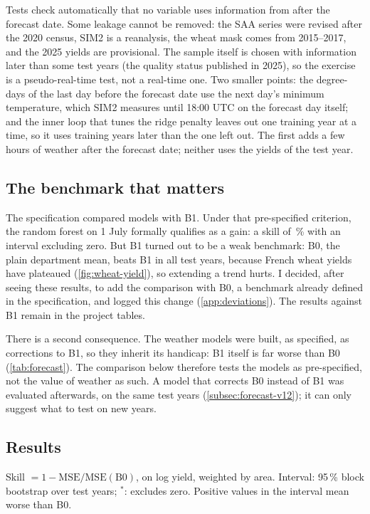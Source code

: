 Tests check automatically that no variable uses information from after the forecast date. Some leakage cannot be removed: the SAA series were revised after the 2020 census, SIM2 is a reanalysis, the wheat mask comes from 2015--2017, and the 2025 yields are provisional. The sample itself is chosen with information later than some test years (the quality status published in 2025), so the exercise is a pseudo-real-time test, not a real-time one. Two smaller points: the degree-days of the last day before the forecast date use the next day's minimum temperature, which SIM2 measures until 18:00 UTC on the forecast day itself; and the inner loop that tunes the ridge penalty leaves out one training year at a time, so it uses training years later than the one left out. The first adds a few hours of weather after the forecast date; neither uses the yields of the test year.

\subsection{The benchmark that matters}

The specification compared models with B1. Under that pre-specified criterion, the random forest on 1 July formally qualifies as a gain: a skill of \RfVsBoneSkill\,\% with an interval excluding zero. But B1 turned out to be a weak benchmark: B0, the plain department mean, beats B1 in all \BzeroBeatsBone{} test years, because French wheat yields have plateaued (\cref{fig:wheat-yield}), so extending a trend hurts. I decided, after seeing these results, to add the comparison with B0, a benchmark already defined in the specification, and logged this change (\cref{app:deviations}). The results against B1 remain in the project tables.

There is a second consequence. The weather models were built, as specified, as corrections to B1, so they inherit its handicap: B1 itself is far worse than B0 (\cref{tab:forecast}). The comparison below therefore tests the models as pre-specified, not the value of weather as such. A model that corrects B0 instead of B1 was evaluated afterwards, on the same test years (\cref{subsec:forecast-v12}); it can only suggest what to test on new years.

\subsection{Results}

\begin{table}[H]
\centering
\small
\caption{Forecast skill relative to the department mean (B0), test years 2016--2025}
\label{tab:forecast}
\begin{threeparttable}

\begin{tablenotes}\footnotesize
\item Skill $= 1 - \mathrm{MSE}/\mathrm{MSE}(\mathrm{B0})$, on log yield, weighted by area. Interval: 95\,\% block bootstrap over test years; $^*$: excludes zero. Positive values in the interval mean worse than B0.
\end{tablenotes}
\end{threeparttable}
\end{table}

